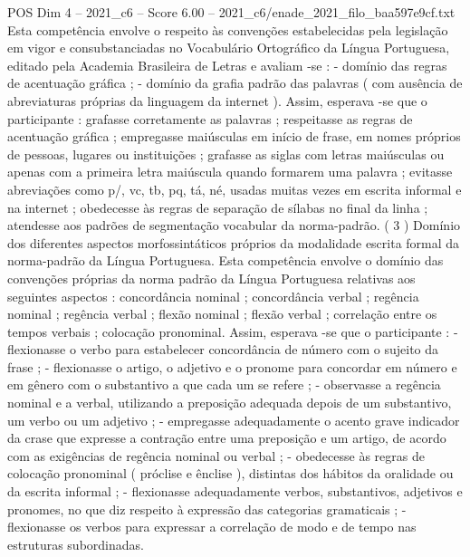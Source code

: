 \begin{textsample}{POS Dim 4 – 2021\_c6 – Score 6.00 – 2021\_c6/enade\_2021\_filo\_baa597e9cf.txt}
Esta competência envolve o respeito às convenções estabelecidas pela legislação em vigor e consubstanciadas no Vocabulário Ortográfico da Língua Portuguesa, editado pela Academia Brasileira de Letras e avaliam -se : - domínio das regras de acentuação gráfica ; - domínio da grafia padrão das palavras ( com ausência de abreviaturas próprias da linguagem da internet ).
Assim, esperava -se que o participante : grafasse corretamente as palavras ; respeitasse as regras de acentuação gráfica ; empregasse maiúsculas em início de frase, em nomes próprios de pessoas, lugares ou instituições ; grafasse as siglas com letras maiúsculas ou apenas com a primeira letra maiúscula quando formarem uma palavra ; evitasse abreviações como p/, vc, tb, pq, tá, né, usadas muitas vezes em escrita informal e na internet ; obedecesse às regras de separação de sílabas no final da linha ; atendesse aos padrões de segmentação vocabular da norma-padrão. ( 3 ) Domínio dos diferentes aspectos morfossintáticos próprios da modalidade escrita formal da norma-padrão da Língua Portuguesa.
Esta competência envolve o domínio das convenções próprias da norma padrão da Língua Portuguesa relativas aos seguintes aspectos : concordância nominal ; concordância verbal ; regência nominal ; regência verbal ; flexão nominal ; flexão verbal ; correlação entre os tempos verbais ; colocação pronominal.
Assim, esperava -se que o participante : - flexionasse o verbo para estabelecer concordância de número com o sujeito da frase ; - flexionasse o artigo, o adjetivo e o pronome para concordar em número e em gênero com o substantivo a que cada um se refere ; - observasse a regência nominal e a verbal, utilizando a preposição adequada depois de um substantivo, um verbo ou um adjetivo ; - empregasse adequadamente o acento grave indicador da crase que expresse a contração entre uma preposição e um artigo, de acordo com as exigências de regência nominal ou verbal ; - obedecesse às regras de colocação pronominal ( próclise e ênclise ), distintas dos hábitos da oralidade ou da escrita informal ; - flexionasse adequadamente verbos, substantivos, adjetivos e pronomes, no que diz respeito à expressão das categorias gramaticais ; - flexionasse os verbos para expressar a correlação de modo e de tempo nas estruturas subordinadas.

\end{textsample}

